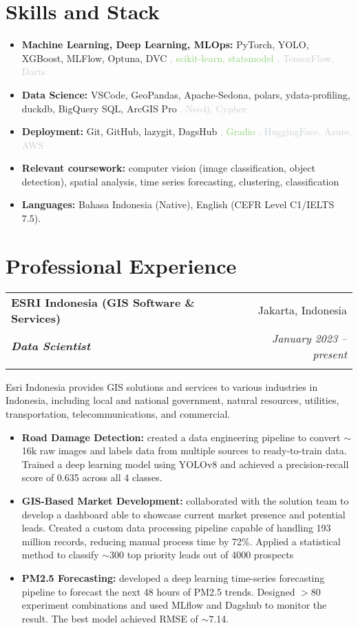 \documentclass[a4paper, 11pt]{article}
\makeatletter
\newcommand{\resumeItem}[2]{
    \item\small{
        \textbf{#1}{#2 \vspace{-2pt}}
    }
}
\newcommand{\resumeSubheading}[4]{
    \vspace{-1pt}
    \begin{tabular*}{\textwidth}{l@{\extracolsep{\fill}}r}
        \color{lightblue}\textbf{#1} & #2 \\
        \textbf{\textit{\small#3}} & \textit{\small #4} \\
        \textnormal{}\vspace{-5pt}
    \end{tabular*}\vspace{-5pt}
}
\newcommand{\resumeItemListStart}{\begin{itemize}[leftmargin=*]\setlength\itemsep{0em}\vspace{-1pt}}
\newcommand{\resumeItemListEnd}{\end{itemize}\vspace{-5pt}}
\makeatother
\begin{document}
    \section{Skills and Stack}
    \resumeItemListStart
    \resumeItem{Machine Learning, Deep Learning, MLOps:}{
        PyTorch, YOLO, XGBoost, MLFlow, Optuna, DVC
        \textcolor[HTML]{8bd274}{, scikit-learn, statsmodel} %
        \textcolor[HTML]{C8cfd4}{, TensorFlow, Darts} %
    }
    \resumeItem{Data Science:}{
        VSCode, GeoPandas, Apache-Sedona, polars, ydata-profiling,
        duckdb, BigQuery SQL, ArcGIS Pro
        \textcolor[HTML]{C8cfd4}{, Neo4j, Cypher} %
    }
    \resumeItem{Deployment:}{
        Git, GitHub, lazygit, DagsHub
        \textcolor[HTML]{8bd274}{, Gradio} %
        \textcolor[HTML]{C8cfd4}{, HuggingFace, Azure, AWS} %
    }
    \resumeItem{Relevant coursework:}{
        computer vision (image classification, object detection),
        spatial analysis,
        time series forecasting,
        clustering,
        classification
    }
    \resumeItem{Languages:}{
        Bahasa Indonesia (Native), 
        English (CEFR Level C1/IELTS 7.5).
    }
    \resumeItemListEnd
	
    \vspace{-5pt}
    \section{Professional Experience}
    \resumeSubheading
    {ESRI Indonesia (GIS Software \& Services)}{Jakarta, Indonesia}
    {Data Scientist}{January 2023 – present}
    \small{Esri Indonesia provides GIS solutions and services to various industries in 
    Indonesia, including local and national government, natural resources, utilities, 
    transportation, telecommunications, and commercial.}
    \vspace{-1pt}
    \resumeItemListStart
    \resumeItem{Road Damage Detection:}{ created a data engineering pipeline to convert $\sim$16k raw images and labels data from multiple sources to ready-to-train data. Trained a deep learning model using YOLOv8 and achieved a precision-recall score of 0.635 across all 4 classes.}
    \resumeItem{GIS-Based Market Development:}{ collaborated with the solution team to 
    develop a dashboard able to showcase current market presence and potential leads. 
    Created a custom data processing pipeline capable of handling 193 million records, 
    reducing manual process time by 72\%. Applied a statistical method to classify 
    $\sim$300 top priority leads out of 4000 prospects
    }
    \resumeItem{PM2.5 Forecasting:}{ developed a deep learning time-series forecasting pipeline to forecast the next 48 hours of PM2.5 trends. Designed $>$80 experiment combinations and used MLflow and Dagshub to monitor the result. The best model achieved RMSE of $\sim$7.14.
    }
    \resumeItemListEnd
\end{document}

